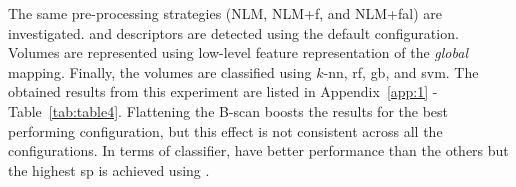 The same pre-processing strategies (NLM, NLM+\acs{f}, and NLM+\acs{fal}) are investigated.
\lbp and \lbptop descriptors are detected using the default configuration.
Volumes are represented using low-level feature representation of the \emph{global} mapping.
Finally, the volumes are classified using $k$-\ac{nn}, \ac{rf}, \ac{gb}, and \ac{svm}.
The obtained results from this experiment are listed in Appendix~\ref{app:1} - Table~\ref{tab:table4}.
Flattening the B-scan boosts the results for the best performing configuration, but this effect is not consistent across all the configurations.
In terms of classifier, \rf have better performance than the others but the highest \ac{sp} is achieved using \svm.




